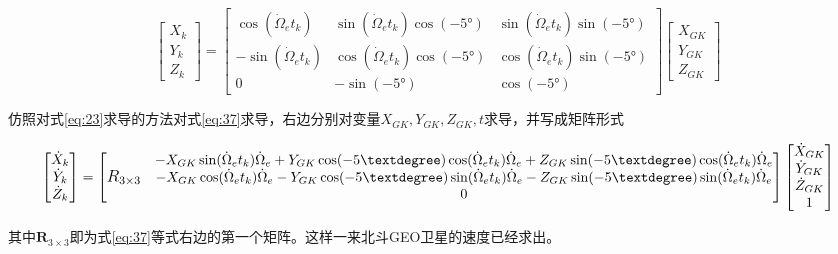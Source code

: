 \documentclass{ctexart}
\begin{document}
\begin{small}
\begin{equation}
\begin{bmatrix}
X_k\\
Y_k\\
Z_k
\end{bmatrix}=\begin{bmatrix}
\cos(\dot{\Omega}_et_k)&\sin(\dot{\Omega}_et_k)\cos(-5°)&\sin(\dot{\Omega}_et_k)\sin(-5°)\\
-\sin(\dot{\Omega}_et_k)&\cos(\dot{\Omega}_et_k)\cos(-5°)&\cos(\dot{\Omega}_et_k)\sin(-5°)\\
0&-\sin(-5°)&\cos(-5°)
\end{bmatrix}\begin{bmatrix}
X_{GK}\\
Y_{GK}\\
Z_{GK}
\end{bmatrix}
\label{eq:37}
\end{equation}
\end{small}
仿照对式\eqref{eq:23}求导的方法对式\eqref{eq:37}求导，右边分别对变量$X_{GK},Y_{GK},Z_{GK},t$求导，并写成矩阵形式
\begin{small}
\begin{equation}
\begin{bmatrix}
\dot{X}_k\\
\dot{Y}_k\\
\dot{Z}_k
\end{bmatrix}=\begin{bmatrix}
\multicolumn{3}{c}{\multirow{3}{*}{\large $R_{3\times3}$}}&-X_{GK}\sin(\dot{\Omega}_et_k)\dot{\Omega}_e+Y_{GK}\cos(-5°)\cos(\dot{\Omega}_et_k)\dot{\Omega}_e+Z_{GK}\sin(-5°)\cos(\dot{\Omega}_et_k)\dot{\Omega}_e\\
\multicolumn{3}{c}{}&-X_{GK}\cos(\dot{\Omega}_et_k)\dot{\Omega}_e-Y_{GK}\cos(-5°)\sin(\dot{\Omega}_et_k)\dot{\Omega}_e-Z_{GK}\sin(-5°)\sin(\dot{\Omega}_et_k)\dot{\Omega}_e\\
\multicolumn{3}{c}{}&0
\end{bmatrix}\begin{bmatrix}
\dot{X}_{GK}\\
\dot{Y}_{GK}\\
\dot{Z}_{GK}\\
1
\end{bmatrix}
\end{equation}
\end{small}
其中$\mathbf{R}_{3\times3}$即为式\eqref{eq:37}等式右边的第一个矩阵。这样一来北斗GEO卫星的速度已经求出。
\end{document}
